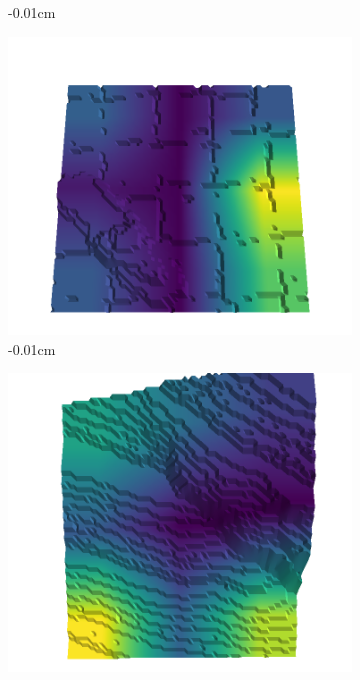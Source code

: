 \documentclass[../document.tex]{subfiles}
\begin{document}
\begin{figure}[H]
\begin{subfigure}[b]{0.242\linewidth}
        \caption{-0.01cm}
        \end{subfigure}
        \begin{subfigure}[b]{0.242\linewidth}
        \includegraphics[width=\linewidth]{../img/5/quarry/false_negative/13-patch-3d-majavi-colormap-80.png}
        \caption{-0.01cm}
        \end{subfigure}
        \begin{subfigure}[b]{0.242\linewidth}
        \includegraphics[width=\linewidth]{../img/5/quarry/false_negative/17-patch-3d-majavi-colormap-85.png}

\end{subfigure}
\end{figure}
\end{document}
